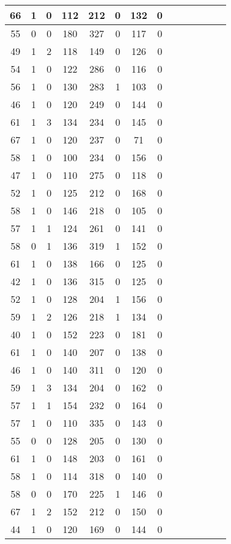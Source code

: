 \documentclass{article}
\begin{document}
\begin{center}
\begin{longtable}{|c|c|c|c|c|c|c|c|c|c|c|c|c|c|}
\hline
66 & 1 & 0 & 112 & 212 & 0 & 132 & 0 \\
\hline
55 & 0 & 0 & 180 & 327 & 0 & 117 & 0 \\
\hline
49 & 1 & 2 & 118 & 149 & 0 & 126 & 0 \\
\hline
54 & 1 & 0 & 122 & 286 & 0 & 116 & 0 \\
\hline
56 & 1 & 0 & 130 & 283 & 1 & 103 & 0 \\
\hline
46 & 1 & 0 & 120 & 249 & 0 & 144 & 0 \\
\hline
61 & 1 & 3 & 134 & 234 & 0 & 145 & 0 \\
\hline
67 & 1 & 0 & 120 & 237 & 0 & 71 & 0 \\
\hline
58 & 1 & 0 & 100 & 234 & 0 & 156 & 0 \\
\hline
47 & 1 & 0 & 110 & 275 & 0 & 118 & 0 \\
\hline
52 & 1 & 0 & 125 & 212 & 0 & 168 & 0 \\
\hline
58 & 1 & 0 & 146 & 218 & 0 & 105 & 0 \\
\hline
57 & 1 & 1 & 124 & 261 & 0 & 141 & 0 \\
\hline
58 & 0 & 1 & 136 & 319 & 1 & 152 & 0 \\
\hline
61 & 1 & 0 & 138 & 166 & 0 & 125 & 0 \\
\hline
42 & 1 & 0 & 136 & 315 & 0 & 125 & 0 \\
\hline
52 & 1 & 0 & 128 & 204 & 1 & 156 & 0 \\
\hline
59 & 1 & 2 & 126 & 218 & 1 & 134 & 0 \\
\hline
40 & 1 & 0 & 152 & 223 & 0 & 181 & 0 \\
\hline
61 & 1 & 0 & 140 & 207 & 0 & 138 & 0 \\
\hline
46 & 1 & 0 & 140 & 311 & 0 & 120 & 0 \\
\hline
59 & 1 & 3 & 134 & 204 & 0 & 162 & 0 \\
\hline
57 & 1 & 1 & 154 & 232 & 0 & 164 & 0 \\
\hline
57 & 1 & 0 & 110 & 335 & 0 & 143 & 0 \\
\hline
55 & 0 & 0 & 128 & 205 & 0 & 130 & 0 \\
\hline
61 & 1 & 0 & 148 & 203 & 0 & 161 & 0 \\
\hline
58 & 1 & 0 & 114 & 318 & 0 & 140 & 0 \\
\hline
58 & 0 & 0 & 170 & 225 & 1 & 146 & 0 \\
\hline
67 & 1 & 2 & 152 & 212 & 0 & 150 & 0 \\
\hline
44 & 1 & 0 & 120 & 169 & 0 & 144 & 0 \\

\end{longtable}
\end{center}
\end{document}
